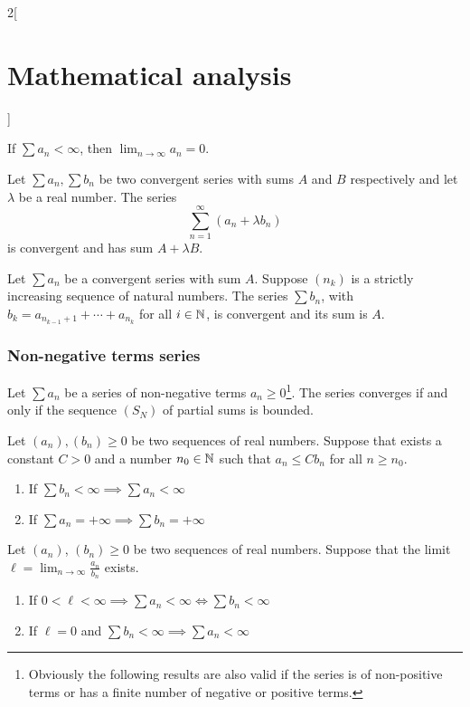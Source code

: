 \documentclass[../../../main.tex]{subfiles}
\begin{document}
\begin{multicols}{2}[\section{Mathematical analysis}]
\begin{corollary}
    If $\sum a_n<\infty$, then $\displaystyle\lim_{n\to \infty} a_n=0$.
  \end{corollary}
  \begin{theorem}[Linearity]
    Let $\sum a_n,\sum b_n$ be two convergent series with sums $A$ and $B$ respectively and let $\lambda$ be a real number. The series $$\sum_{n=1}^\infty (a_n+\lambda b_n)$$ is convergent and has sum $A+\lambda B$.
  \end{theorem}
  \begin{theorem}
    Let $\sum a_n$ be a convergent series with sum $A$. Suppose $(n_k)$ is a strictly increasing sequence of natural numbers. The series $\sum b_n$, with $b_k=a_{n_{k-1}+1}+\cdots+a_{n_k}$ for all $i\in\mathbb{N} $, is convergent and its sum is $A$.
  \end{theorem}
  \subsubsection{Non-negative terms series}
  \begin{theorem}
    Let $\sum a_n$ be a series of non-negative terms $a_n\geq 0$\footnote{Obviously the following results are also valid if the series is of non-positive terms or has a finite number of negative or positive terms.}. The series converges if and only if the sequence $(S_N)$ of partial sums is bounded.
  \end{theorem}
  \begin{theorem}
    Let $(a_n),(b_n)\geq 0$ be two sequences of real numbers. Suppose that exists a constant $C>0$ and a number $n_0\in\mathbb{N} $ such that $a_n\leq Cb_n$ for all $n\geq n_0$.
    \begin{enumerate}
      \item If $\sum b_n<\infty\implies\sum a_n<\infty$
      \item If $\sum a_n=+\infty\implies\sum b_n=+\infty$
    \end{enumerate}
  \end{theorem}
  \begin{theorem}
    Let $(a_n)$, $(b_n)\geq 0$ be two sequences of real numbers. Suppose that the limit $\ell=\displaystyle\lim_{n\to\infty}\frac{a_n}{b_n}$ exists.
    \begin{enumerate}
      \item If $0<\ell<\infty\implies\sum a_n<\infty\iff\sum b_n<\infty$
      \item If $\ell=0$ and $\sum b_n<\infty\implies\sum a_n<\infty$

\end{enumerate}
\end{theorem}
\end{multicols}
\end{document}

